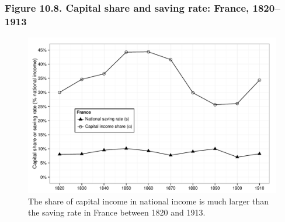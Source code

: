 \documentclass[t]{beamer}\usepackage[]{graphicx}\usepackage[]{color}
\newenvironment{knitrout}{}{} %
\begin{document}
\begin{frame}[label=Figure_10_8]
\frametitle{Figure 10.8. Capital share and saving rate: France, 1820--1913}
\begin{figure}[t]
\begin{minipage}[b]{\textwidth}
\centering
\begin{knitrout}\footnotesize
{}\color{fgcolor}

{\centering \includegraphics[width=1\linewidth]{figures/bw/Figure_10_8} 

}



\end{knitrout}
\caption{The share of capital income in national income is much larger than the saving rate in France between 1820 and 1913.}
\end{minipage}
\end{figure}
\end{frame}
\end{document}
